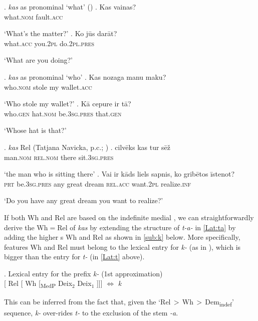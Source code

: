 \ex.  \textit{kas} as pronominal `what' (\citealt{Praulins2012})
\ag. Kas vainas?\\
what.\textsc{nom} fault.\textsc{acc}\\
\strut `What's the matter?'
\bg. Ko j\={u}s dar\={a}t?\\
what.\textsc{acc} you.\textsc{2pl} do.\textsc{2pl.pres}\\
\strut `What are you doing?'

\ex.  \textit{kas} as pronominal `who'
\ag. Kas nozaga manu maku?\\
who.\textsc{nom} stole my wallet.\textsc{acc}\\
\strut `Who stole my wallet?'
\bg. K\={a} cepure ir t\={a}?\label{conc2}\\
who.\textsc{gen} hat.\textsc{nom} be.\textsc{3sg.pres} that.\textsc{gen}\\
\strut `Whose hat is that?'

\ex.   \textit{kas} Rel (Tatjana Navicka, p.c.; \citealt{Nau2009})
\ag. cilv\={e}ks kas tur s\={e}\v{z}\label{conc3}\\
man.\textsc{nom} \textsc{rel.nom} there sit.\textsc{3sg.pres}\\
\strut `the man who is sitting there'
\bg. Vai ir k\={a}ds liels sapnis, ko grib\={e}tos \={i}stenot?\\
\textsc{prt} be.\textsc{3sg.pres} any great dream \textsc{rel.acc} want.\textsc{2pl} realize.\textsc{inf}\\
\strut `Do you have any great dream you want to realize?'


\noindent If both Wh and Rel are based on the indefinite medial , we can straightforwardly derive the Wh$=$Rel  of \textit{kas} by extending the structure of \textit{t-a-} in \ref{Lat:ta} by adding the higher s Wh and Rel as shown in \ref{sub:k} below.  More specifically, features Wh and Rel must belong to the lexical entry for \textit{k-} (as in ), which is bigger than the entry for \textit{t-} (in \ref{Lat:t} above). 

\ex. Lexical entry for the  prefix \textit{k-} (1st approximation)\label{old:k}\\[0.5ex]
[ Rel [ Wh [\textsubscript{MedP} Deix$_{2}$ Deix$_{1}$ ]]] $\Leftrightarrow$ \textit{k}

This can be inferred from the fact that, given the `Rel\,$>$\,Wh\,$>$\,Dem\textsubscript{indef}' sequence, \textit{k-} over-rides \textit{t-} to the exclusion of the stem \textit{-a}. 

